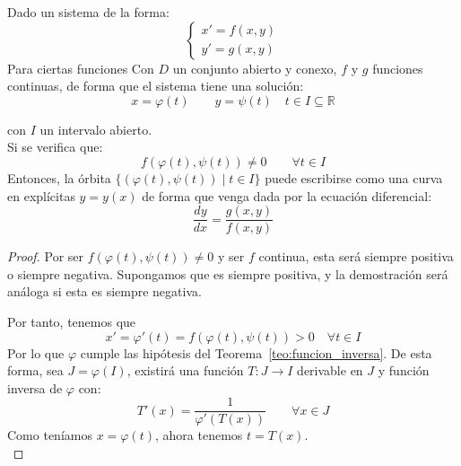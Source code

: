 \begin{teo}
    Dado un sistema de la forma:
    \begin{equation*}
        \left\{\begin{array}{c}
                x' = f(x,y) \\
                y' = g(x,y)
        \end{array}\right.
    \end{equation*}
    Para ciertas funciones
    Con $D$ un conjunto abierto y conexo, $f$ y $g$ funciones continuas, de forma que el sistema tiene una solución:
    \begin{equation*}
        x = \varphi(t) \qquad y=\psi(t) \quad t\in I\subseteq \mathbb{R}
    \end{equation*}

    con $I$ un intervalo abierto.\\

    Si se verifica que:
    \begin{equation*}
        f(\varphi(t),\psi(t)) \neq 0 \qquad \forall t\in I
    \end{equation*}
    Entonces, la órbita $\{(\varphi(t),\psi(t))\mid t \in I\}$ puede escribirse como una curva en explícitas $y=y(x)$ de forma que venga dada por la ecuación diferencial:
    \begin{equation*}
        \dfrac{dy}{dx} = \dfrac{g(x,y)}{f(x,y)}
    \end{equation*}

    \begin{proof}
        Por ser $f(\varphi(t),\psi(t))\neq 0$ y ser $f$ continua, esta será siempre positiva o siempre negativa. Supongamos que es siempre positiva, y la demostración será análoga si esta es siempre negativa.

        Por tanto, tenemos que
        \begin{equation*}
            x' = \varphi'(t) = f(\varphi(t),\psi(t)) > 0 \quad \forall t\in I
        \end{equation*}
        Por lo que $\varphi$ cumple las hipótesis del Teorema~\ref{teo:funcion_inversa}. De esta forma, sea $J=\varphi(I)$, existirá una función $T:J\longrightarrow I$ derivable en $J$ y función inversa de $\varphi$ con:
        \begin{equation*}
            T'(x) = \dfrac{1}{\varphi'(T(x))} \qquad \forall x\in J
        \end{equation*}
        Como teníamos $x=\varphi (t)$, ahora tenemos $t = T(x)$.\\


\end{proof}
\end{teo}
